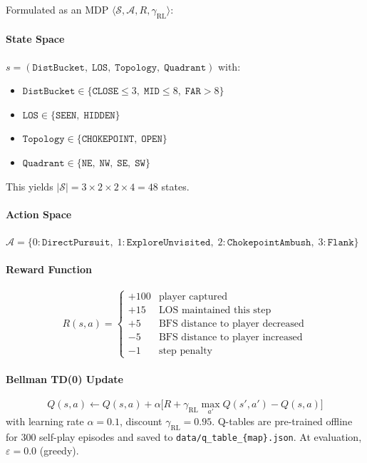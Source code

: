 \documentclass[conference,onecolumn]{IEEEtran}
\begin{document}
Formulated as an MDP $\langle \mathcal{S}, \mathcal{A}, R, \gamma_{\text{RL}} \rangle$:

\paragraph{State Space}
$s = (\texttt{DistBucket},\; \texttt{LOS},\; \texttt{Topology},\;
\texttt{Quadrant})$ with:
\begin{itemize}
  \item $\texttt{DistBucket} \in \{\texttt{CLOSE}{\le}3,\;
        \texttt{MID}{\le}8,\; \texttt{FAR}{>}8\}$
  \item $\texttt{LOS} \in \{\texttt{SEEN},\; \texttt{HIDDEN}\}$
  \item $\texttt{Topology} \in \{\texttt{CHOKEPOINT},\; \texttt{OPEN}\}$
  \item $\texttt{Quadrant} \in \{\texttt{NE},\; \texttt{NW},\;
        \texttt{SE},\; \texttt{SW}\}$
\end{itemize}
This yields $|\mathcal{S}| = 3 \times 2 \times 2 \times 4 = 48$ states.

\paragraph{Action Space}
$\mathcal{A} = \{0: \texttt{DirectPursuit},\;
1: \texttt{ExploreUnvisited},\;
2: \texttt{ChokepointAmbush},\;
3: \texttt{Flank}\}$

\paragraph{Reward Function}
\begin{equation}
  R(s,a) =
  \begin{cases}
    +100 & \text{player captured} \\
    +15  & \text{LOS maintained this step} \\
    +5   & \text{BFS distance to player decreased} \\
    -5   & \text{BFS distance to player increased} \\
    -1   & \text{step penalty}
  \end{cases}
\end{equation}

\paragraph{Bellman TD(0) Update}
\begin{equation}
  Q(s,a) \leftarrow Q(s,a)
  + \alpha \bigl[R + \gamma_{\text{RL}} \max_{a'} Q(s',a') - Q(s,a)\bigr]
\end{equation}
with learning rate $\alpha = 0.1$, discount $\gamma_{\text{RL}} = 0.95$.
Q-tables are pre-trained offline for 300 self-play episodes and
saved to \texttt{data/q\_table\_\{map\}.json}.
At evaluation, $\varepsilon = 0.0$ (greedy).
\end{document}
